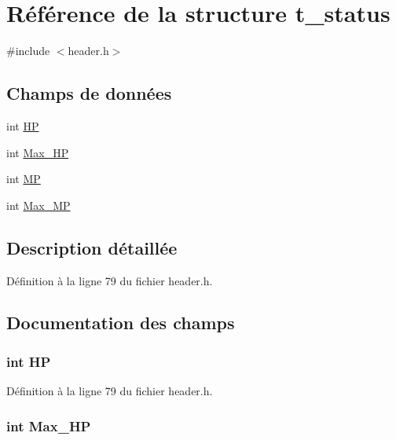 \hypertarget{structt__status}{\section{Référence de la structure t\+\_\+status}
\label{structt__status}
}


{\ttfamily \#include $<$header.\+h$>$}

\subsection*{Champs de données}
\begin{DoxyCompactItemize}
\item 
int \hyperlink{structt__status_a58ca25ca6c9448a364b84539e42f1fa6}{H\+P}
\item 
int \hyperlink{structt__status_a3ae8966f5c827b3c74072acda8de72af}{Max\+\_\+\+H\+P}
\item 
int \hyperlink{structt__status_a30fc75b90111fc791752dd1add6ed991}{M\+P}
\item 
int \hyperlink{structt__status_a5e48a681ff3d92aaa0e643fbc32ab2f7}{Max\+\_\+\+M\+P}
\end{DoxyCompactItemize}


\subsection{Description détaillée}


Définition à la ligne 79 du fichier header.\+h.



\subsection{Documentation des champs}
\hypertarget{structt__status_a58ca25ca6c9448a364b84539e42f1fa6}{
\subsubsection[{H\+P}]{\setlength{\rightskip}{0pt plus 5cm}int H\+P}}\label{structt__status_a58ca25ca6c9448a364b84539e42f1fa6}


Définition à la ligne 79 du fichier header.\+h.

\hypertarget{structt__status_a3ae8966f5c827b3c74072acda8de72af}{
\subsubsection[{Max\+\_\+\+H\+P}]{\setlength{\rightskip}{0pt plus 5cm}int Max\+\_\+\+H\+P}}\label{structt__status_a3ae8966f5c827b3c74072acda8de72af}


